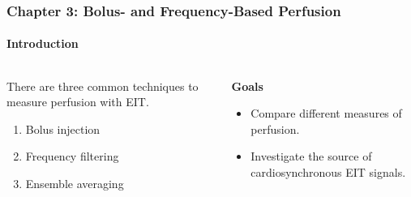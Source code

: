 \documentclass[10pt,    %
    english,            %
    xcolor=table,       %
    envcountsect,        %
    aspectratio=1610
]{beamer}
\begin{document}
\begin{frame}
	\vspace{5mm}
	\frametitle{Chapter 3: Bolus- and Frequency-Based Perfusion}
	\framesubtitle{Introduction}
	\begin{columns}[c]
	\begin{column}{0.5\textwidth}
		There are \alert{three common techniques} to measure perfusion with EIT. \\ \vspace{2mm}
		\begin{enumerate}
			\item Bolus injection 
			\item Frequency filtering
			\item Ensemble averaging
		\end{enumerate}
	\end{column}
	\begin{column}{0.5\textwidth}
		\textbf{Goals}
		\begin{itemize}
			\item Compare different measures of perfusion.
			\item Investigate the source of cardiosynchronous EIT signals. 
		\end{itemize}
	\end{column}
	\end{columns}
\end{frame}
\end{document}
